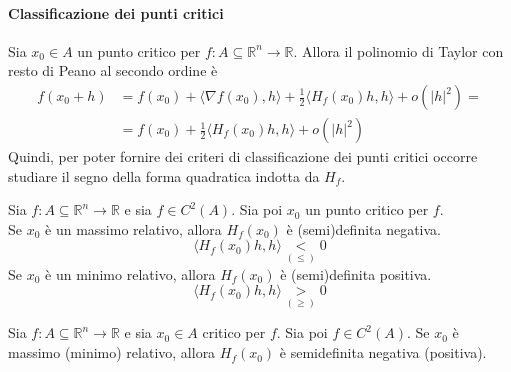 \paragraph{Classificazione dei punti critici} Sia $x_0 \in A$ un punto critico per $f:A \subseteq \mathbb{R}^n\to \mathbb{R}$. Allora il polinomio di Taylor con resto di Peano al secondo ordine è
\begin{equation}
    \begin{aligned}
        f(x_0+h)&=f(x_0)+ \langle \nabla f(x_0), h\rangle+ \frac{1}{2}\langle H_f(x_0)h,h \rangle +o(|h|^2)=\\ 
        &= f(x_0)+ \frac{1}{2}\langle H_f(x_0)h,h \rangle + o(|h|^2)
    \end{aligned}
\end{equation} 
Quindi, per poter fornire dei criteri di classificazione dei punti critici occorre studiare il segno della forma quadratica indotta da $H_f$.
\begin{proposition}
    Sia $f:A \subseteq \mathbb{R}^n \to \mathbb{R}$ e sia $f \in C^2(A)$. Sia poi $x_0$ un punto critico per $f$.\\
    Se $x_0$ è un massimo relativo, allora $H_f(x_0)$ è (semi)definita negativa.
    \begin{equation}
        \langle H_f(x_0)h, h \rangle \underset{(\leq)}{<} 0
    \end{equation}
    Se $x_0$ è un minimo relativo, allora $H_f(x_0)$ è (semi)definita positiva.
    \begin{equation}
        \langle H_f(x_0)h, h \rangle \underset{(\geq)}{>} 0
    \end{equation}
\end{proposition}
\begin{theorem}  \label{Teo: Condizione necessaria del secondo ordine}
Sia $f: A \subseteq \mathbb{R}^n \to \mathbb{R}$ e sia $x_0 \in A$ critico per $f$. Sia poi $f \in C^2(A)$. Se $x_0$ è massimo (minimo) relativo, allora $H_f(x_0)$ è semidefinita negativa (positiva).
\end{theorem}
